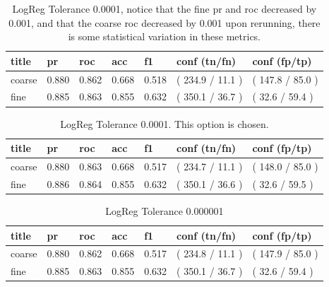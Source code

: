 \documentclass[ms]{nuthesis}
\begin{document}
\FloatBarrier
\begin{table}[H]
\centering
\begin{tabular}{|l||l||l||l||l||l||l|}\toprule
title & pr & roc & acc & f1 & conf (tn/fn) & conf (fp/tp) \\ \midrule
coarse & 0.880 & 0.862 & 0.668 & 0.518 & ( 234.9 / 11.1 ) & ( 147.8 / 85.0 ) \\
fine & 0.885 & 0.863 & 0.855 & 0.632 & ( 350.1 / 36.7 ) & ( 32.6 / 59.4 ) \\ \bottomrule
\end{tabular}
\caption{LogReg Tolerance 0.0001, notice that the fine pr and roc decreased by 0.001, and that the
coarse roc decreased by 0.001 upon rerunning, there is some statistical variation in these metrics.}
\label{tab:LogRegOrig-0001}
\end{table}
\FloatBarrier




\FloatBarrier
\begin{table}[h]
\centering
\begin{tabular}{|l||l||l||l||l||l||l|}\toprule
title & pr & roc & acc & f1 & conf (tn/fn) & conf (fp/tp) \\ \midrule
coarse & 0.880 & 0.863 & 0.668 & 0.517 & ( 234.7 / 11.1 ) & ( 148.0 / 85.0 ) \\
fine & 0.886 & 0.864 & 0.855 & 0.632 & ( 350.1 / 36.6 ) & ( 32.6 / 59.5 ) \\ \bottomrule
\end{tabular}
\caption{LogReg Tolerance 0.0001. This option is chosen.}
\label{tab:LogReg-00001Redo}
\end{table}
\FloatBarrier



\FloatBarrier
\begin{table}[H]
\centering
\begin{tabular}{|l||l||l||l||l||l||l|}\toprule
title & pr & roc & acc & f1 & conf (tn/fn) & conf (fp/tp) \\ \midrule
coarse & 0.880 & 0.862 & 0.668 & 0.517 & ( 234.8 / 11.1 ) & ( 147.9 / 85.0 ) \\
fine & 0.885 & 0.863 & 0.855 & 0.632 & ( 350.1 / 36.7 ) & ( 32.6 / 59.4 ) \\ \bottomrule
\end{tabular}
\caption{LogReg Tolerance 0.000001}
\label{tab:LogReg-000001}
\end{table}
\FloatBarrier
\end{document}
